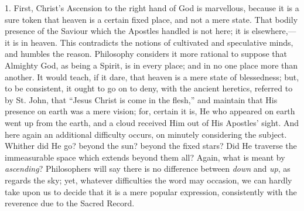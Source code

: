 1. First, Christ's Ascension to the right hand of God is marvellous,
because it is a sure token that heaven is a certain fixed place, and not
a mere state. That bodily presence of the Saviour which the Apostles
handled is not here; it is elsewhere,—it is in heaven. This
contradicts the notions of cultivated and speculative minds, and humbles
the reason. Philosophy considers it more rational to suppose that
Almighty God, as being a Spirit, is in every place; and in no one place
more than another. It would teach, if it dare, that heaven is a mere
state of blessedness; but, to be consistent, it ought to go on to deny,
with the ancient heretics, referred to by St. John, that ``Jesus
Christ is come in the flesh,'' and maintain that His presence on
earth was a mere vision; for, certain it is, He who appeared on earth
went up from the earth, and a cloud received Him out of His Apostles'
sight. And here again an additional difficulty occurs, on minutely
considering the subject. Whither did He go? beyond the sun? beyond the
fixed stars? Did He traverse the immeasurable space which extends beyond
them all? Again, what is meant by \emph{ascending}? Philosophers will
say there is no difference between \emph{down} and \emph{up}, as regards
the sky; yet, whatever difficulties the word may occasion, we can hardly
take upon us to decide that it is a mere popular expression,
consistently with the reverence due to the Sacred Record.

